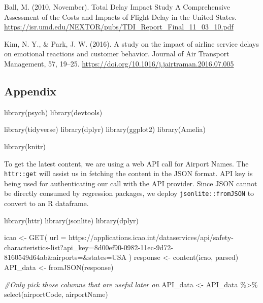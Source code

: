 \documentclass[
]{article}
\newenvironment{Shaded}{\begin{snugshade}}{\end{snugshade}}
\newcommand{\AttributeTok}[1]{\textcolor[rgb]{0.77,0.63,0.00}{#1}}
\newcommand{\CommentTok}[1]{\textcolor[rgb]{0.56,0.35,0.01}{\textit{#1}}}
\newcommand{\FunctionTok}[1]{\textcolor[rgb]{0.00,0.00,0.00}{#1}}
\newcommand{\NormalTok}[1]{#1}
\newcommand{\OtherTok}[1]{\textcolor[rgb]{0.56,0.35,0.01}{#1}}
\newcommand{\SpecialCharTok}[1]{\textcolor[rgb]{0.00,0.00,0.00}{#1}}
\newcommand{\StringTok}[1]{\textcolor[rgb]{0.31,0.60,0.02}{#1}}
\begin{document}
Ball, M. (2010, November). Total Delay Impact Study A Comprehensive
Assessment of the Costs and Impacts of Flight Delay in the United
States.
\url{https://isr.umd.edu/NEXTOR/pubs/TDI_Report_Final_11_03_10.pdf}

Kim, N. Y., \& Park, J. W. (2016). A study on the impact of airline
service delays on emotional reactions and customer behavior. Journal of
Air Transport Management, 57, 19--25.
\url{https://doi.org/10.1016/j.jairtraman.2016.07.005}

\hypertarget{appendix}{%
\subsection{Appendix}\label{appendix}}

\begin{Shaded}
\begin{Highlighting}[]
  \FunctionTok{library}\NormalTok{(psych)}
  \FunctionTok{library}\NormalTok{(devtools)}

  \FunctionTok{library}\NormalTok{(tidyverse)}
  \FunctionTok{library}\NormalTok{(dplyr)}
  \FunctionTok{library}\NormalTok{(ggplot2)}
  \FunctionTok{library}\NormalTok{(Amelia)}

  \FunctionTok{library}\NormalTok{(knitr)}
\end{Highlighting}
\end{Shaded}

To get the latest content, we are using a web API call for Airport
Names. The \texttt{httr::get} will assist us in fetching the content in
the JSON format. API key is being used for authenticating our call with
the API provider. Since JSON cannot be directly consumed by regression
packages, we deploy \texttt{jsonlite::fromJSON} to convert to an R
dataframe.

\begin{Shaded}
\begin{Highlighting}[]
\FunctionTok{library}\NormalTok{(httr)}
\FunctionTok{library}\NormalTok{(jsonlite)}
\FunctionTok{library}\NormalTok{(dplyr)}

\NormalTok{icao }\OtherTok{\textless{}{-}} \FunctionTok{GET}\NormalTok{(}
  \AttributeTok{url =} \StringTok{\textquotesingle{}https://applications.icao.int/dataservices/api/safety{-}characteristics{-}list?api\_key=8d00ef90{-}0982{-}11ec{-}9d72{-}8160549d64ab\&airports=\&states=USA\textquotesingle{}}
\NormalTok{)}
\NormalTok{response }\OtherTok{\textless{}{-}} \FunctionTok{content}\NormalTok{(icao, }\StringTok{\textquotesingle{}parsed\textquotesingle{}}\NormalTok{)}
\NormalTok{API\_data }\OtherTok{\textless{}{-}} \FunctionTok{fromJSON}\NormalTok{(response)}

\CommentTok{\#Only pick those columns that are useful later on }
\NormalTok{API\_data }\OtherTok{\textless{}{-}}\NormalTok{ API\_data }\SpecialCharTok{\%\textgreater{}\%} \FunctionTok{select}\NormalTok{(airportCode, airportName)}
\end{Highlighting}
\end{Shaded}
\end{document}
